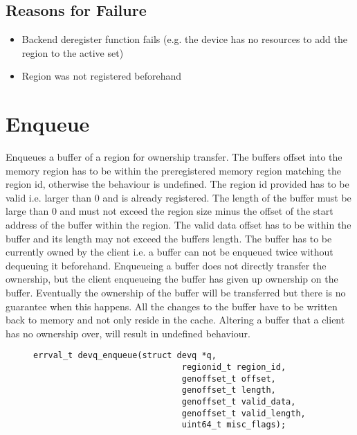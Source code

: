 \documentclass[a4paper,11pt,twoside]{report}
\begin{document}
{{	\subsection*{Reasons for Failure}
	\begin{itemize}
		\item Backend deregister function fails (e.g. the device has no resources to add the region to the active set)
		\item Region was not registered beforehand 
	\end{itemize}
	
	\section{Enqueue}
	Enqueues a buffer of a region for ownership transfer. The buffers offset into the memory region 
	has to be within the preregistered memory region matching the region id, otherwise the behaviour 
	is undefined. The region id provided has to be valid i.e.
	larger than 0 and is already registered. The length of the buffer must be large than 0 and must not
	exceed the region size minus the offset of the start address of the buffer within the 
	region. The valid data offset has to be within the buffer and its length may not exceed
	the buffers length. 
	The buffer has to be currently owned by the client i.e. a buffer 
	can not be enqueued twice without dequeuing it beforehand. 
	Enqueueing a buffer does not directly transfer the ownership, but the client
	enqueueing the buffer has given up ownership on the buffer. Eventually the ownership
	of the buffer will be transferred but there is no guarantee when this happens.
	All the changes to the buffer have to be written back to memory and not only 
	reside in the cache. Altering a buffer that a client has no ownership over, will result in undefined behaviour.
	
	\begin{figure}[h]
		\begin{lstlisting}[style=code]
		errval_t devq_enqueue(struct devq *q,
		                      regionid_t region_id,
		                      genoffset_t offset,
		                      genoffset_t length,
		                      genoffset_t valid_data,
		                      genoffset_t valid_length,
		                      uint64_t misc_flags);
		\end{lstlisting}
		\label{lst:enqueue}
	\end{figure}
	
}}
\end{document}
